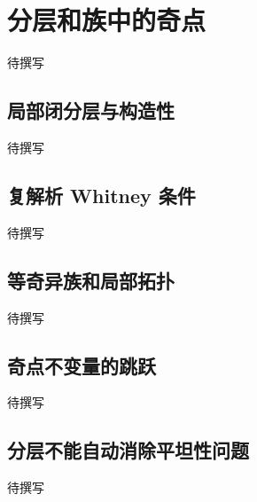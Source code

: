
% 
% 
% 

\section{分层和族中的奇点}
\label{g5:sec:2904}

待撰写

\subsection{局部闭分层与构造性}
\label{g5:subsec:2904:01}
待撰写

\subsection{复解析 Whitney 条件}
\label{g5:subsec:2904:02}
待撰写

\subsection{等奇异族和局部拓扑}
\label{g5:subsec:2904:03}
待撰写

\subsection{奇点不变量的跳跃}
\label{g5:subsec:2904:04}
待撰写

\subsection{分层不能自动消除平坦性问题}
\label{g5:subsec:2904:05}
待撰写
